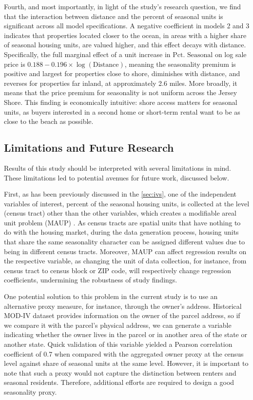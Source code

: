 \documentclass[11pt]{article}
\begin{document}
    Fourth, and most importantly, in light of the study's research question, we find that the interaction between distance and the percent of seasonal units is significant across all model specifications. A negative coefficient in models 2 and 3 indicates that properties located closer to the ocean, in areas with a higher share of seasonal housing units, are valued higher, and this effect decays with distance. Specifically, the full marginal effect of a unit increase in $\text{Pct. Seasonal}$ on log sale price is $0.188 - 0.196 \times \log(\text{Distance})$, meaning the seasonality premium is positive and largest for properties close to shore, diminishes with distance, and reverses for properties far inland, at approximately 2.6 miles. More broadly, it means that the price premium for seasonality is not uniform across the Jersey Shore. This finding is economically intuitive: shore access matters for seasonal units, as buyers interested in a second home or short-term rental want to be as close to the beach as possible. 

    \subsection{Limitations and Future Research}\label{sec:limitations}

    Results of this study should be interpreted with several limitations in mind. These limitations led to potential avenues for future work, discussed below.

    First, as has been previously discussed in the \autoref{sec:ivs}, one of the independent variables of interest, percent of the seasonal housing units, is collected at the level (census tract) other than the other variables, which creates a modifiable areal unit problem (MAUP) \parencite{leeetal2016-ModifiableArealUnit}. As census tracts are spatial units that have nothing to do with the housing market, during the data generation process, housing units that share the same seasonality character can be assigned different values due to being in different census tracts. Moreover, MAUP can affect regression results on the respective variable, as changing the unit of data collection, for instance, from census tract to census block or ZIP code, will respectively change regression coefficients, undermining the robustness of study findings.
    
    One potential solution to this problem in the current study is to use an alternative proxy measure, for instance, through the owner's address. Historical MOD-IV dataset provides information on the owner of the parcel address, so if we compare it with the parcel's physical address, we can generate a variable indicating whether the owner lives in the parcel or in another area of the state or another state. Quick validation of this variable yielded a Pearson correlation coefficient of 0.7 when compared with the aggregated owner proxy at the census level against share of seasonal units at the same level. However, it is important to note that such a proxy would not capture the distinction between renters and seasonal residents. Therefore, additional efforts are required to design a good seasonality proxy. 
\end{document}
